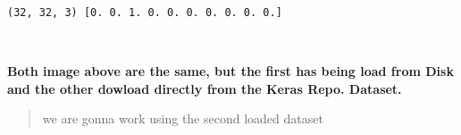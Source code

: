 \documentclass[11pt]{article}
\begin{document}
    \begin{Verbatim}[commandchars=\\\{\}]
(32, 32, 3) [0. 0. 1. 0. 0. 0. 0. 0. 0. 0.]

    \end{Verbatim}

    \begin{center}
    \end{center}
    { \hspace*{\fill} \\}
    
    \textbf{Both image above are the same, but the first has being load from
Disk and the other dowload directly from the Keras Repo. Dataset.}

\begin{quote}
we are gonna work using the second loaded dataset
\end{quote}
\end{document}
